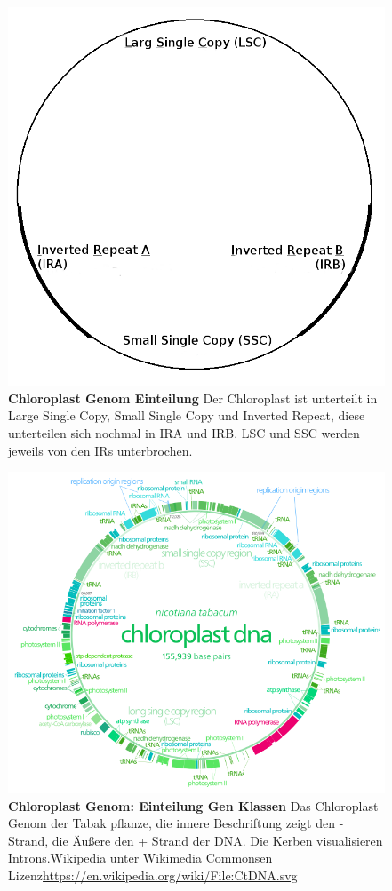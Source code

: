 \documentclass{scrartcl}
\begin{document}
\begin{figure}
\includegraphics[width=.9\linewidth]{./Chloroplast_1.png}
\caption[Chloroplast Genom Einteilung]{\textbf{Chloroplast Genom Einteilung} Der Chloroplast ist unterteilt in Large Single Copy, Small Single Copy und Inverted Repeat, diese unterteilen sich nochmal in IRA und IRB. LSC und SSC werden jeweils von den IRs unterbrochen.}
\end{figure}

\begin{figure}
\includegraphics[width=.9\linewidth]{./703px-CtDNA.png}
\caption[Chloroplast Genom: Gen Klassen]{\textbf{Chloroplast Genom: Einteilung Gen Klassen} Das Chloroplast Genom der Tabak pflanze, die innere Beschriftung zeigt den - Strand, die Äußere den + Strand der DNA. Die Kerben visualisieren Introns.Wikipedia unter Wikimedia Commonsen Lizenz\url{https://en.wikipedia.org/wiki/File:CtDNA.svg}}
\end{figure}
\end{document}
